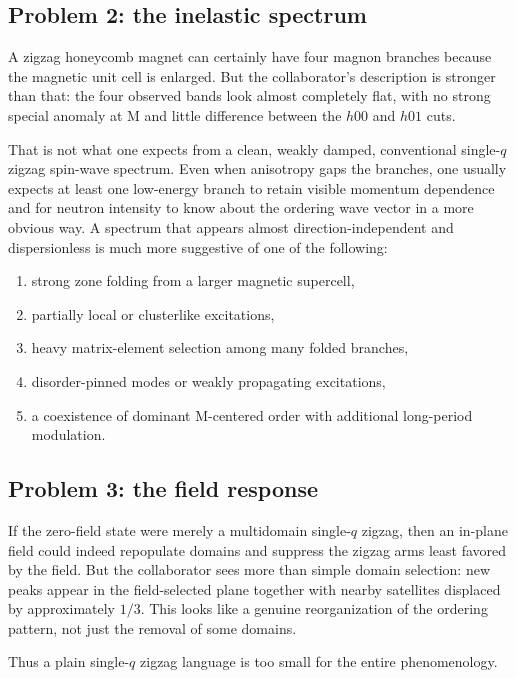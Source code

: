 \documentclass[11pt]{article}
\begin{document}
\subsection{Problem 2: the inelastic spectrum}

A zigzag honeycomb magnet can certainly have four magnon branches because the magnetic unit cell is enlarged. But the collaborator's description is stronger than that: the four observed bands look almost completely flat, with no strong special anomaly at M and little difference between the \(h00\) and \(h01\) cuts.

That is not what one expects from a clean, weakly damped, conventional single-$q$ zigzag spin-wave spectrum. Even when anisotropy gaps the branches, one usually expects at least one low-energy branch to retain visible momentum dependence and for neutron intensity to know about the ordering wave vector in a more obvious way. A spectrum that appears almost direction-independent and dispersionless is much more suggestive of one of the following:
\begin{enumerate}[leftmargin=2em,itemsep=0.3em]
    \item strong zone folding from a larger magnetic supercell,
    \item partially local or clusterlike excitations,
    \item heavy matrix-element selection among many folded branches,
    \item disorder-pinned modes or weakly propagating excitations,
    \item a coexistence of dominant M-centered order with additional long-period modulation.
\end{enumerate}

\subsection{Problem 3: the field response}

If the zero-field state were merely a multidomain single-$q$ zigzag, then an in-plane field could indeed repopulate domains and suppress the zigzag arms least favored by the field. But the collaborator sees more than simple domain selection: new peaks appear in the field-selected plane together with nearby satellites displaced by approximately \(1/3\). This looks like a genuine reorganization of the ordering pattern, not just the removal of some domains.

Thus a plain single-$q$ zigzag language is too small for the entire phenomenology.
\end{document}
